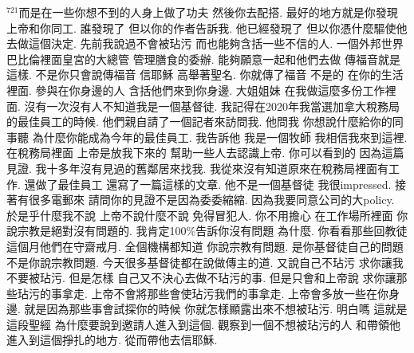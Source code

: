 \documentclass{book}
\begin{document}
$^{721}$而是在一些你想不到的人身上做了功夫 然後你去配搭.
最好的地方就是你發現上帝和你同工.
誰發現了 但以你的作者告訴我.
他已經發現了 但以你憑什麼驅使他去做這個決定.
先前我說過不會被玷污 而也能夠含括一些不信的人.
一個外邦世界 巴比倫裡面皇宮的大總管 管理膳食的委辦.
能夠願意一起和他們去做 傳福音就是這樣.
不是你只會說傳福音 信耶穌 高舉著聖名.
你就傳了福音 不是的 在你的生活裡面.
參與在你身邊的人 含括他們來到你身邊.
大姐姐妹 在我做這麼多份工作裡面.
沒有一次沒有人不知道我是一個基督徒.
我記得在2020年我當選加拿大稅務局的最佳員工的時候.
他們親自請了一個記者來訪問我.
他問我 你想說什麼給你的同事聽 為什麼你能成為今年的最佳員工.
我告訴他 我是一個牧師 我相信我來到這裡.
在稅務局裡面 上帝是放我下來的 幫助一些人去認識上帝.
你可以看到的 因為這篇見證.
我十多年沒有見過的舊鄰居來找我.
我從來沒有知道原來在稅務局裡面有工作.
還做了最佳員工 還寫了一篇這樣的文章.
他不是一個基督徒 我很impressed.
接著有很多電郵來 請問你的見證不是因為委委縮縮.
因為我要同意公司的大policy.
於是乎什麼我不說 上帝不說什麼不說 免得冒犯人.
你不用擔心 在工作場所裡面 你說宗教是絕對沒有問題的.
我肯定100\%告訴你沒有問題 為什麼.
你看看那些回教徒 這個月他們在守齋戒月.
全個機構都知道 你說宗教有問題.
是你基督徒自己的問題 不是你說宗教問題.
今天很多基督徒都在說做傳主的道.
又說自己不玷污 求你讓我不要被玷污.
但是怎樣 自己又不決心去做不玷污的事.
但是只會和上帝說 求你讓那些玷污的事拿走.
上帝不會將那些會使玷污我們的事拿走.
上帝會多放一些在你身邊.
就是因為那些事會試探你的時候 你就怎樣顯露出來不想被玷污.
明白嗎 這就是這段聖經 為什麼要說到邀請人進入到這個.
觀察到一個不想被玷污的人 和帶領他進入到這個掙扎的地方.
從而帶他去信耶穌.
\end{document}
